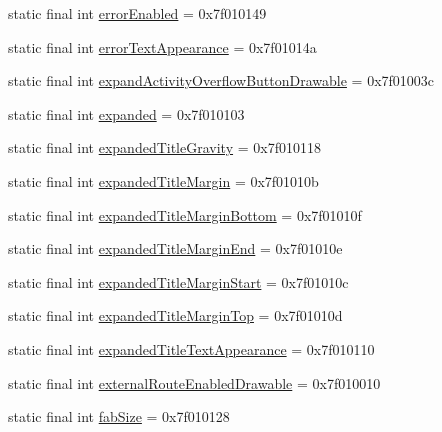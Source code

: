 \begin{CompactItemize}
\item 
static final int \hyperlink{classandroid_1_1support_1_1v7_1_1recyclerview_1_1_r_1_1attr_e6b3a2e39988b34541dc5b3c489bb50a}{errorEnabled} = 0x7f010149
\item 
static final int \hyperlink{classandroid_1_1support_1_1v7_1_1recyclerview_1_1_r_1_1attr_3446bf67ad6915a18e83546db5f21921}{errorTextAppearance} = 0x7f01014a
\item 
static final int \hyperlink{classandroid_1_1support_1_1v7_1_1recyclerview_1_1_r_1_1attr_19eecefa0b7171b53a2e8c7805a7a2a9}{expandActivityOverflowButtonDrawable} = 0x7f01003c
\item 
static final int \hyperlink{classandroid_1_1support_1_1v7_1_1recyclerview_1_1_r_1_1attr_783284841cc247a1593b5a896080fa82}{expanded} = 0x7f010103
\item 
static final int \hyperlink{classandroid_1_1support_1_1v7_1_1recyclerview_1_1_r_1_1attr_fbbb2d9857c0129cf8f68a6f55a3680a}{expandedTitleGravity} = 0x7f010118
\item 
static final int \hyperlink{classandroid_1_1support_1_1v7_1_1recyclerview_1_1_r_1_1attr_42353f0c28d8ca57ddc4663ff5241f14}{expandedTitleMargin} = 0x7f01010b
\item 
static final int \hyperlink{classandroid_1_1support_1_1v7_1_1recyclerview_1_1_r_1_1attr_99d10633e8aab962f20cc33e57836a06}{expandedTitleMarginBottom} = 0x7f01010f
\item 
static final int \hyperlink{classandroid_1_1support_1_1v7_1_1recyclerview_1_1_r_1_1attr_cef261dc3a88b719942c8fce6d4b1d1a}{expandedTitleMarginEnd} = 0x7f01010e
\item 
static final int \hyperlink{classandroid_1_1support_1_1v7_1_1recyclerview_1_1_r_1_1attr_6f8ec3bfeb805bdc9167ffa31c8cd264}{expandedTitleMarginStart} = 0x7f01010c
\item 
static final int \hyperlink{classandroid_1_1support_1_1v7_1_1recyclerview_1_1_r_1_1attr_d81d65065369514e481528f534dfc4c6}{expandedTitleMarginTop} = 0x7f01010d
\item 
static final int \hyperlink{classandroid_1_1support_1_1v7_1_1recyclerview_1_1_r_1_1attr_2c54c0bf76aab362b45958a9e2afa61a}{expandedTitleTextAppearance} = 0x7f010110
\item 
static final int \hyperlink{classandroid_1_1support_1_1v7_1_1recyclerview_1_1_r_1_1attr_d5ad51e05d1b0c6aa75b0d37963b0b19}{externalRouteEnabledDrawable} = 0x7f010010
\item 
static final int \hyperlink{classandroid_1_1support_1_1v7_1_1recyclerview_1_1_r_1_1attr_03e54dd11972cd2363eba34bb4d8d594}{fabSize} = 0x7f010128

\end{CompactItemize}
